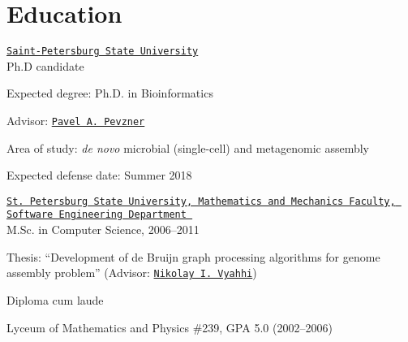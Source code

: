 \section{Education}
%
%
\href{http://english.spbu.ru/}{\tt Saint-Petersburg State University}\\
  Ph.D candidate
\begin{innerlist}
  \item Expected degree: Ph.D. in Bioinformatics
  \item Advisor: \href{http://cseweb.ucsd.edu/~ppevzner/}{\tt Pavel A.~Pevzner}
  \item Area of study: \textit{de novo} microbial (single-cell) and metagenomic assembly
  \item Expected defense date: Summer 2018
\end{innerlist}

\blankline

\href{http://www.math.spbu.ru/en/index.html}{\tt St.~Petersburg State University, Mathematics and Mechanics Faculty, Software Engineering Department 
}\\
  M.Sc. in Computer Science, 2006--2011 %
\begin{innerlist}
  \item Thesis: ``Development of de Bruijn graph processing algorithms
        for genome assembly problem'' (Advisor: \href{http://spbsu.ru/vyahhi/}{\tt Nikolay I.~Vyahhi})
  \item Diploma cum laude
\end{innerlist}

\blankline

Lyceum of Mathematics and Physics \#239, GPA 5.0 (2002--2006)


